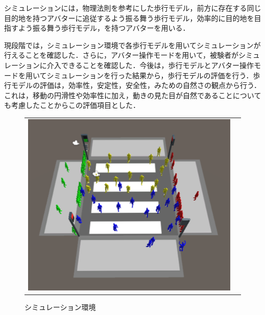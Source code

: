 \documentclass[twocolumn]{jarticle}%
\begin{document}
シミュレーションには，物理法則を参考にした歩行モデル\cite{Akuzawa}，前方に存在する同じ目的地を持つアバターに追従するよう振る舞う歩行モデル\cite{Sasagawa}，効率的に目的地を目指すよう振る舞う歩行モデル，を持つアバターを用いる．

現段階では，シミュレーション環境で各歩行モデルを用いてシミュレーションが行えることを確認した．さらに，アバター操作モードを用いて，被験者がシミュレーションに介入できることを確認した．今後は，歩行モデルとアバター操作モードを用いてシミュレーションを行った結果から，歩行モデルの評価を行う．歩行モデルの評価は，効率性\cite{Iryo-Youryou}，安定性\cite{Iryo-Youryou}，安全性，みための自然さ\cite{Iryo-VRE}の観点から行う．これは，移動の円滑性や効率性に加え，動きの見た目が自然であることについても考慮したことからこの評価項目とした．

\begin{figure}[H]
    \begin{tabular}{cc}
      \begin{minipage}[t]{0.45\hsize}
        \centering
        \includegraphics[keepaspectratio, scale=0.11]{images/environment.JPG}
        \caption{シミュレーション環境}
        \label{fig:environment}
      \end{minipage} &
      \begin{minipage}[t]{0.45\hsize}
        \centering

\end{minipage}
\end{tabular}
\end{figure}
\end{document}
